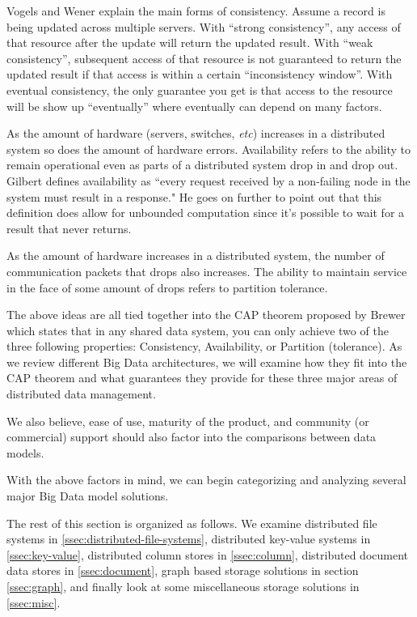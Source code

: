 \documentclass[]{article}
\begin{document}
Vogels and Wener\cite{vogels_eventually_2008} explain the main forms of consistency. Assume a record is being updated across multiple servers. With ``strong consistency'', any access of that resource after the update will return the updated result. With ``weak consistency'', subsequent access of that resource is not guaranteed to return the updated result if that access is within a certain ``inconsistency window''. With eventual consistency, the only guarantee you get is that access to the resource will be show up ``eventually'' where eventually can depend on many factors.

As the amount of hardware (servers, switches, \textit{etc}) increases in a distributed system so does the amount of hardware errors. Availability refers to the ability to remain operational even as parts of a distributed system drop in and drop out\cite{chen_big_2014}. Gilbert\cite{gilbert2002brewer} defines availability as ``every request received by a non-failing node in the system must result in a response." He goes on further to point out that this definition does allow for unbounded computation since it's possible to wait for a result that never returns.

As the amount of hardware increases in a distributed system, the number of communication packets that drops also increases. The ability to maintain service in the face of some amount of drops refers to partition tolerance\cite{chen_big_2014}.

The above ideas are all tied together into the CAP theorem proposed by Brewer\cite{brewer2000towards} which states that in any shared data system, you can only achieve two of the three following properties: Consistency, Availability, or Partition (tolerance). As we review different Big Data architectures, we will examine how they fit into the CAP theorem and what guarantees they provide for these three major areas of distributed data management.

We also believe, ease of use, maturity of the product, and community (or commercial) support should also factor into the comparisons between data models. 

With the above factors in mind, we can begin categorizing and analyzing several major Big Data model solutions.

The rest of this section is organized as follows. We examine distributed file systems in \ref{ssec:distributed-file-systems}, distributed key-value systems in \ref{ssec:key-value}, distributed column stores in \ref{ssec:column}, distributed document data stores in \ref{ssec:document}, graph based storage solutions in section \ref{ssec:graph}, and finally look at some miscellaneous storage solutions in \ref{ssec:misc}.
\end{document}
